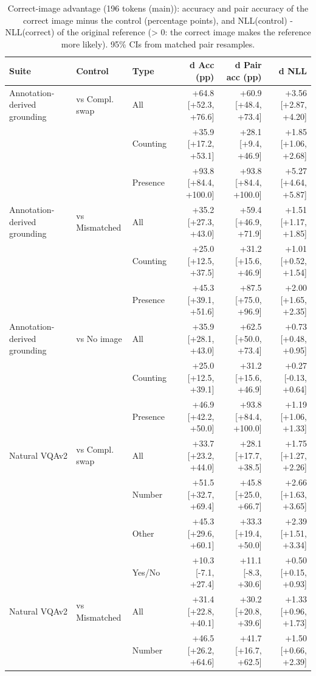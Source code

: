 \begin{table}[t]
\centering
\small
\caption{Correct-image advantage (196 tokens (main)): accuracy and pair accuracy of the correct image minus the control (percentage points), and NLL(control) - NLL(correct) of the original reference (> 0: the correct image makes the reference more likely). 95\% CIs from matched pair resamples.}
\label{tab:t2_t3_correct_image_advantage_main}
\begin{tabular}{lllrrr}
\toprule
Suite & Control & Type & d Acc (pp) & d Pair acc (pp) & d NLL \\
\midrule
Annotation-derived grounding & vs Compl. swap & All & +64.8 [+52.3, +76.6] & +60.9 [+48.4, +73.4] & +3.56 [+2.87, +4.20] \\
 &  & Counting & +35.9 [+17.2, +53.1] & +28.1 [+9.4, +46.9] & +1.85 [+1.06, +2.68] \\
 &  & Presence & +93.8 [+84.4, +100.0] & +93.8 [+84.4, +100.0] & +5.27 [+4.64, +5.87] \\
Annotation-derived grounding & vs Mismatched & All & +35.2 [+27.3, +43.0] & +59.4 [+46.9, +71.9] & +1.51 [+1.17, +1.85] \\
 &  & Counting & +25.0 [+12.5, +37.5] & +31.2 [+15.6, +46.9] & +1.01 [+0.52, +1.54] \\
 &  & Presence & +45.3 [+39.1, +51.6] & +87.5 [+75.0, +96.9] & +2.00 [+1.65, +2.35] \\
Annotation-derived grounding & vs No image & All & +35.9 [+28.1, +43.0] & +62.5 [+50.0, +73.4] & +0.73 [+0.48, +0.95] \\
 &  & Counting & +25.0 [+12.5, +39.1] & +31.2 [+15.6, +46.9] & +0.27 [-0.13, +0.64] \\
 &  & Presence & +46.9 [+42.2, +50.0] & +93.8 [+84.4, +100.0] & +1.19 [+1.06, +1.33] \\
Natural VQAv2 & vs Compl. swap & All & +33.7 [+23.2, +44.0] & +28.1 [+17.7, +38.5] & +1.75 [+1.27, +2.26] \\
 &  & Number & +51.5 [+32.7, +69.4] & +45.8 [+25.0, +66.7] & +2.66 [+1.63, +3.65] \\
 &  & Other & +45.3 [+29.6, +60.1] & +33.3 [+19.4, +50.0] & +2.39 [+1.51, +3.34] \\
 &  & Yes/No & +10.3 [-7.1, +27.4] & +11.1 [-8.3, +30.6] & +0.50 [+0.15, +0.93] \\
Natural VQAv2 & vs Mismatched & All & +31.4 [+22.8, +40.1] & +30.2 [+20.8, +39.6] & +1.33 [+0.96, +1.73] \\
 &  & Number & +46.5 [+26.2, +64.6] & +41.7 [+16.7, +62.5] & +1.50 [+0.66, +2.39] \\

\end{tabular}
\end{table}
